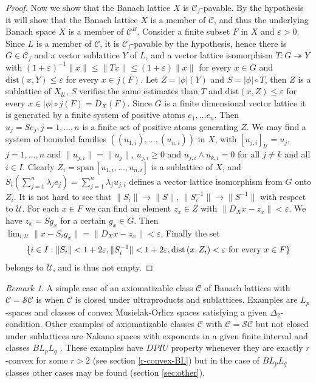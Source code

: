 \documentclass[11pt]{amsart}
\theoremstyle{plain}
\theoremstyle{remark}
\newtheorem{remark}[theorem]{Remark}
\newcommand{\C}{\mathcal C}
\newcommand{\U}{\mathcal U}
\newcommand{\eps}{\varepsilon}
\begin{document}
\begin{proof}
Now we show that the Banach lattice $X$ is $\C_f$-pavable. By the hypothesis it will show that the Banach lattice $X$ is a member of $\C$, and thus the underlying Banach space  $X$ is a member of $\C^B$. Consider a finite subset $F$ in $X$ and $\eps>0$. Since $L$ is a member of $\C$, it is $\C_f$-pavable by the hypothesis, hence there is $G\in \C_f$ and a vector sublattice $Y$ of $L$, and a vector lattice isomorphism $T: G\twoheadrightarrow Y$ with $(1+\eps)^{-1}\|x\|\le \|Tx\|\le (1+\eps)\|x\|$ for every $x\in G$ and $\mathrm{dist}(x,Y)\le \eps$ for every $x\in j(F)$. Let $Z=|\phi|(Y)$ and $S=|\phi|\circ T$, then $Z$ is a sublattice of $X_\U$, $S$ verifies the same estimates than $T$ and  $\mathrm{dist}(x,Z)\le \eps$ for every $x\in |\phi|\circ j(F)=D_X(F)$. Since $G$ is a finite dimensional vector lattice it is generated by a finite system of positive atoms $e_1,\dots e_n$. Then $u_j=Se_j, j=1,\dots,n$ is a finite set of positive atoms generating $Z$. We may find a system of bounded families $((u_{1,i}),\dots, (u_{n,i}))$ in $X$, with $[u_{j,i}]_\U=u_j$, $j=1,\dots,n$ and $\|u_{j,i}\|=\|u_j\|$, $u_{j,i}\ge 0$ and $u_{j,i}\wedge u_{k,i}=0$ for all $j\ne k$ and all $i\in I$. Clearly $Z_i=\mathrm{span}\,[u_{1,i},\dots,u_{n,i}]$ is a sublattice of $X$, and $S_i(\sum_{j=1}^n\lambda_j e_j)= \sum_{j=1}^n\lambda_j u_{j,i}$ defines a 
vector lattice isomorphism from $G$ onto $Z_i$. It is not hard to see that $\|S_i\|\to \|S\|$, $\|S_i^{-1}\|\to \|S^{-1}\|$ with respect to $\U$. For each $x\in F$ we can find an element $z_x\in Z$ with $\|D_X x-z_x\|<\eps$. We have $z_x=Sg_x$ for a certain $g_x\in G$. Then $\lim_{i,\U} \|x-S_ig_x\|=\|D_X x-z_x\|<\eps$. Finally the set
\[\{i\in I: \|S_i\|<1+2\eps,  \|S_i^{-1}\|<1+2\eps, \mathrm{dist}\,(x,Z_i)<\eps \hbox{ for every } x\in F\}\]
belongs to $\U$, and is thus not empty.
\end{proof}

\begin{remark}
A simple case of an axiomatizable class $\C$ of Banach lattices with $\C=\mathcal{SC}$ is when $\C$ is closed under ultraproducts and sublattices. Examples are $L_p$-spaces and  classes of convex Musielak-Orlicz spaces satisfying a given $\Delta_2$-condition. Other examples of axiomatizable classes $\C$ with $\C=\mathcal{SC}$ but not closed under sublattices are Nakano spaces with exponents in a given finite interval \cite{PR} and classes $BL_pL_q$ \cite{HR}. These examples have $DPIU$ property whenever they are exactly $r$-convex for some $r>2$ (see section \ref{r-convex-BL}) but in the case of $BL_pL_q$ classes  other cases may be found (section \ref{sec:other}).
\end{remark}
\end{document}
